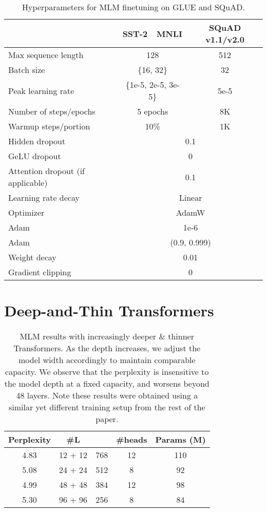 \documentclass{article}
\begin{document}
\begin{table}[t]
\centering
\begin{tabular}{@{}l|cc|c@{}}
\toprule
 & SST-2 & MNLI & SQuAD v1.1/v2.0 \\ \midrule
Max sequence length & \multicolumn{2}{c|}{128} & 512 \\
Batch size & \multicolumn{2}{c|}{\{16, 32\}} & 32 \\
Peak learning rate & \multicolumn{2}{c|}{\{1e-5, 2e-5, 3e-5\}} & 5e-5 \\
Number of steps/epochs & \multicolumn{2}{c|}{5 epochs} & 8K \\
Warmup steps/portion & \multicolumn{2}{c|}{10\%} & 1K \\
\midrule
Hidden dropout & \multicolumn{3}{c}{0.1} \\
GeLU dropout & \multicolumn{3}{c}{0} \\
Attention dropout (if applicable) & \multicolumn{3}{c}{0.1} \\
Learning rate decay & \multicolumn{3}{c}{Linear} \\
Optimizer & \multicolumn{3}{c}{AdamW} \\
Adam  & \multicolumn{3}{c}{1e-6} \\
Adam  & \multicolumn{3}{c}{(0.9, 0.999)} \\
Weight decay & \multicolumn{3}{c}{0.01} \\
Gradient clipping & \multicolumn{3}{c}{0} \\
\bottomrule
\end{tabular}
\caption{Hyperparameters for MLM finetuning on GLUE and SQuAD.}
\end{table}


\FloatBarrier
\section{Deep-and-Thin Transformers}
\label{sec:deeper-thinner-tfm}
\begin{table}[h]
\centering
\begin{tabular}{@{}ccccc@{}}
\toprule
Perplexity & \#L &  & \#heads & Params (M) \\ \midrule
4.83 & 12 + 12 & 768 & 12 & 110 \\
5.08 & 24 + 24 & 512 & 8 & 92 \\
4.99 & 48 + 48 & 384 & 12 & 98 \\
5.30 & 96 + 96 & 256 & 8 & 84 \\ \bottomrule
\end{tabular}
\caption{MLM results with increasingly deeper \& thinner Transformers. As the depth increases,
we adjust the model width accordingly to maintain comparable capacity. We observe that the perplexity is insensitive to the model depth at a fixed capacity, and worsens beyond 48 layers. Note these results were obtained using a similar yet different training setup from the rest of the paper.}
\end{table}
\end{document}
